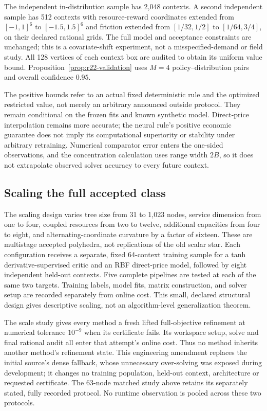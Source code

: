 The independent in-distribution sample has 2,048 contexts. A second independent sample has 512 contexts with resource-reward coordinates extended from $[-1,1]^6$ to $[-1.5,1.5]^6$ and friction extended from $[1/32,1/2]$ to $[1/64,3/4]$, on their declared rational grids. The full model and acceptance constraints are unchanged; this is a covariate-shift experiment, not a misspecified-demand or field study. All 128 vertices of each context box are audited to obtain its uniform value bound. Proposition~\ref{prop:r22-validation} uses $M=4$ policy--distribution pairs and overall confidence $0.95$.



The positive bounds refer to an actual fixed deterministic rule and the optimized restricted value, not merely an arbitrary announced outside protocol. They remain conditional on the frozen fits and known synthetic model. Direct-price interpolation remains more accurate; the neural rule's positive economic guarantee does not imply its computational superiority or stability under arbitrary retraining. Numerical comparator error enters the one-sided observations, and the concentration calculation uses range width $2B$, so it does not extrapolate observed solver accuracy to every future context.

\subsection{Scaling the full accepted class}
The scaling design varies tree size from 31 to 1,023 nodes, service dimension from one to four, coupled resources from two to twelve, additional capacities from four to eight, and alternating-coordinate curvature by a factor of sixteen. These are multistage accepted polyhedra, not replications of the old scalar star. Each configuration receives a separate, fixed 64-context training sample for a tanh derivative-supervised critic and an RBF direct-price model, followed by eight independent held-out contexts. Five complete pipelines are tested at each of the same two targets. Training labels, model fits, matrix construction, and solver setup are recorded separately from online cost. This small, declared structural design gives descriptive scaling, not an algorithm-level generalization theorem.

The scale study gives every method a fresh lifted full-objective refinement at numerical tolerance $10^{-9}$ when its certificate fails. Its workspace setup, solve and final rational audit all enter that attempt's online cost. Thus no method inherits another method's refinement state. This engineering amendment replaces the initial source's dense fallback, whose unnecessary over-solving was exposed during development; it changes no training population, held-out context, architecture or requested certificate. The 63-node matched study above retains its separately stated, fully recorded protocol. No runtime observation is pooled across these two protocols.

